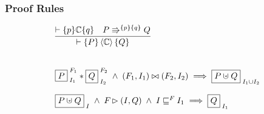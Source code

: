\subsubsection*{Proof Rules}
%
\[
\begin{array}{l}

	\infer{
		\vdash \{ P \}
		\atomic{\mathbb{C}}
	 	\{ Q \}
	}
	{		
		\vdash\{p\} \mathbb{C} \{q\} & \repartitions{P}{Q}{p}{q} 
	}	\\\\\\




	
	\shared{P}{I_1}^{\;\fence{1}}
	* \shared{Q}{I_2}^{\;\fence{2}}
	\;\land\; (\fence{1}, I_1) \agrees (\fence{2}, I_2)
	\implies 
	\shared{P \sepish Q}{I_1 \cup I_2}
	\\\\
	
	\shared{P \sepish Q}{I}
	\;\land\; 
	\fence{} \fences (I, Q)
	\;\land\; 
	I  \weakenI{\fence{}} I_1 
	\implies 
	\shared{Q}{I_1}

\end{array}\\
\]
